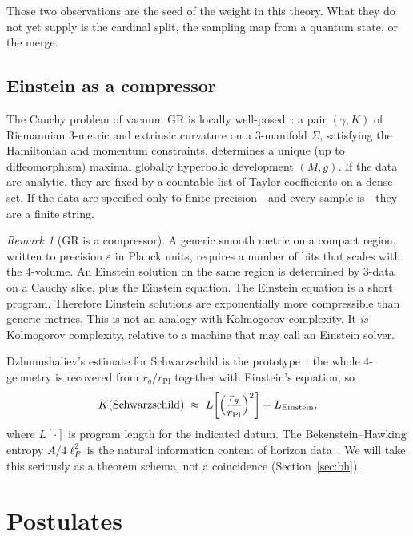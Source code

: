 \documentclass[11pt,a4paper]{article}
\theoremstyle{plain}
\theoremstyle{definition}
\theoremstyle{remark}
\newtheorem{remark}[theorem]{Remark}
\begin{document}
Those two observations are the seed of the weight in this theory.
What they do not yet supply is the cardinal split, the sampling map from a quantum state, or the merge.

\subsection{Einstein as a compressor}

The Cauchy problem of vacuum GR is locally well-posed~\cite{choquetbruhat1952,hawking1973}: a pair $(\gamma,K)$ of Riemannian $3$-metric and extrinsic curvature on a $3$-manifold $\Sigma$, satisfying the Hamiltonian and momentum constraints, determines a unique (up to diffeomorphism) maximal globally hyperbolic development $(M,g)$.
If the data are analytic, they are fixed by a countable list of Taylor coefficients on a dense set.
If the data are specified only to finite precision---and every sample is---they are a finite string.

\begin{remark}[GR is a compressor]
\label{rem:compressor}
A generic smooth metric on a compact region, written to precision $\varepsilon$ in Planck units, requires a number of bits that scales with the $4$-volume.
An Einstein solution on the same region is determined by $3$-data on a Cauchy slice, plus the Einstein equation.
The Einstein equation is a short program.
Therefore Einstein solutions are exponentially more compressible than generic metrics.
This is not an analogy with Kolmogorov complexity.
It \emph{is} Kolmogorov complexity, relative to a machine that may call an Einstein solver.
\end{remark}

Dzhunushaliev's estimate for Schwarzschild is the prototype~\cite{dzhunushaliev1998}: the whole $4$-geometry is recovered from $r_{g}/r_{\mathrm{Pl}}$ together with Einstein's equation, so
\begin{equation}
  K(\text{Schwarzschild}) \;\approx\; L\!\left[\Bigl(\frac{r_{g}}{r_{\mathrm{Pl}}}\Bigr)^{2}\right] + L_{\mathrm{Einstein}},
\end{equation}
where $L[\cdot]$ is program length for the indicated datum.
The Bekenstein--Hawking entropy $A/4\ell_{P}^{2}$ is the natural information content of horizon data~\cite{bekenstein1973,hawking1975}.
We will take this seriously as a theorem schema, not a coincidence (Section~\ref{sec:bh}).

\section{Postulates}
\end{document}

